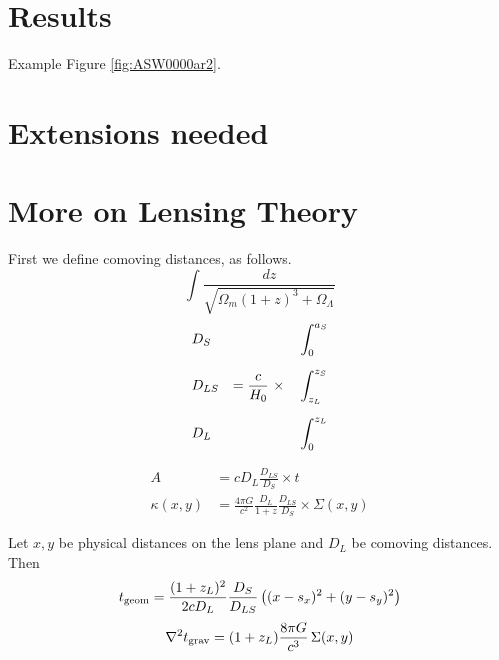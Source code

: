 \documentclass[12pt,preprint]{aastex}
\begin{document}
\section{Results} \label{sec:results}

Example Figure \ref{fig:ASW0000ar2}.

\section{Extensions needed} \label{sec:todo}

\appendix

\section{More on Lensing Theory} \label{sec:more-theory}

First we define comoving distances, as follows.
\begin{equation}
\int \frac{dz}{\sqrt{\Omega_m(1+z)^3 + \Omega_\Lambda}}
\end{equation}
\begin{equation}
\begin{aligned}
&D_S    &                                &\int_0^{a_S} \\
\noalign{\medskip}
&D_{LS} & = \frac c{H_0} \ \times \quad  &\int_{z_L}^{z_S} \\
\noalign{\medskip}
&D_L    &                                &\int_0^{z_L}
\end{aligned}
\end{equation}

\begin{equation}
\begin{aligned}
A           &= cD_L \frac{D_{LS}}{D_S} \times t \\
\kappa(x,y) &= \frac{4\pi G}{c^2} \frac{D_L}{1+z} \frac{D_{LS}}{D_S}
               \times \Sigma(x,y)
\end{aligned}
\end{equation}

Let $x,y$ be physical distances on the lens plane and $D_L$ be
comoving distances.  Then
\begin{equation}
t_{\rm geom} = \frac{(1+z_L)^2}{2cD_L} \frac{D_S}{D_{LS}}
\left( (x-s_x)^2 + (y-s_y)^2 \right)
\end{equation}
\begin{equation}
\nabla^2 t_{\rm grav} = (1+z_L)\frac{8\pi G}{c^3} \, \Sigma(x,y)
\end{equation}
\end{document}
